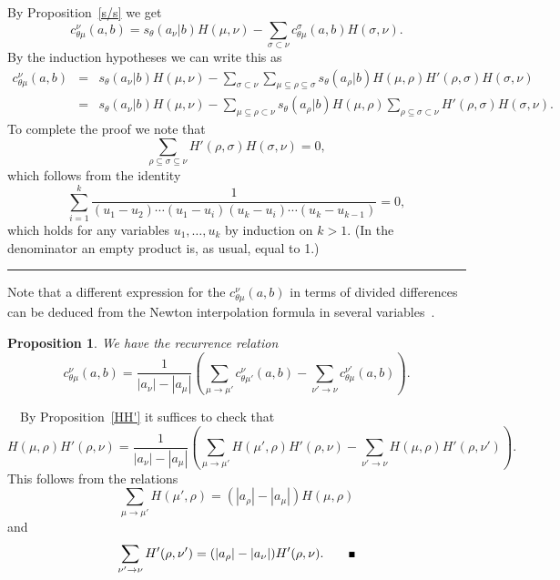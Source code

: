 \documentclass[titlepage,12pt]{article}
\newcommand{\bpr}{\begin{prop}}
\newcommand{\epr}{\end{prop}}
\newcommand{\beq}{\begin{equation}}
\newcommand{\eeq}{\end{equation}}
\newcommand{\bea}{\begin{eqnarray*}}
\newcommand{\eea}{\end{eqnarray*}}
\newcommand{\Qed}{\rule{1ex}{1ex} \medskip}
\newcommand{\0}{{\bf 0}}
\newcommand{\1}{{\bf 1}}
\newcommand{\2}{{\bf 2}}
\newcommand{\3}{{\bf 3}}
\newcommand{\4}{{\bf 4}}
\newcommand{\5}{{\bf 5}}
\newcommand{\6}{{\bf 6}}
\newcommand{\7}{{\bf 7}}
\newcommand{\8}{{\bf 8}}
\newcommand{\9}{{\bf 9}}
\newcommand{\Proof}{\noindent{\bf Proof.}\ \ }
\newtheorem{prop}[thm]{Proposition}
\begin{document}
By Proposition~\ref{s/s} we get
$$
c_{\theta\mu}^{\nu}(a,b)=s_{\theta}(a_{\nu}|b) H(\mu,\nu)
-\sum_{\sigma\subset\nu}c_{\theta\mu}^{\sigma}(a,b) H(\sigma,\nu).
$$
By the induction hypotheses we can write this as
\bea
c_{\theta\mu}^{\nu}(a,b)&=&s_{\theta}(a_{\nu}|b) H(\mu,\nu)
-\sum_{\sigma\subset\nu}\sum_{\mu\subseteq\rho\subseteq\sigma}
s_{\theta}(a_{\rho}|b) H(\mu,\rho)H'(\rho,\sigma)H(\sigma,\nu)\\
	&=&s_{\theta}(a_{\nu}|b) H(\mu,\nu)
-\sum_{\mu\subseteq\rho\subset\nu}s_{\theta}(a_{\rho}|b) H(\mu,\rho)
\sum_{\rho\subseteq\sigma\subset\nu}H'(\rho,\sigma)H(\sigma,\nu).
\eea
To complete the proof we note that
$$
\sum_{\rho\subseteq\sigma\subseteq\nu}H'(\rho,\sigma)H(\sigma,\nu)=0,
$$
which follows from the identity
$$
\sum_{i=1}^k\frac{1}{(u_1-u_2)\cdots(u_1-u_i)
(u_k-u_i)\cdots(u_k-u_{k-1})}=0,
$$
which holds for any variables $u_1,\dots,u_{k}$ by induction on $k>1$.
(In the denominator an empty product is, as usual, equal to 1.)\hfill\Qed

Note that a different expression for the $c_{\theta\mu}^{\nu}(a,b)$
in terms of divided differences  
can be deduced from the Newton
interpolation formula in several variables~\cite{ls:in}.


\bpr
We have the recurrence relation
\beq						\label{rr}
c_{\theta\mu}^{\nu}(a,b)=\frac{1}{|a_{\nu}|-|a_{\mu}|}\left(
\sum_{\mu\to\mu'}c_{\theta\mu'}^{\nu}(a,b)
-\sum_{\nu'\to\nu}c_{\theta\mu}^{\nu'}(a,b)\right). 
\eeq
\epr

\Proof By Proposition~\ref{HH'} it suffices to check that
$$
H(\mu,\rho) H'(\rho,\nu)=\frac{1}{|a_{\nu}|-|a_{\mu}|}\left(
\sum_{\mu\to\mu'}H(\mu',\rho) H'(\rho,\nu)
-\sum_{\nu'\to\nu}H(\mu,\rho) H'(\rho,\nu')\right).
$$
This follows from the relations
$$
\sum_{\mu\to\mu'}H(\mu',\rho)=(|a_{\rho}|-|a_{\mu}|)H(\mu,\rho)
$$
and
$$
\sum_{\nu'\to\nu}H'(\rho,\nu')=(|a_{\rho}|-|a_{\nu}|)H'(\rho,\nu).\qquad\Qed
$$
\end{document}
